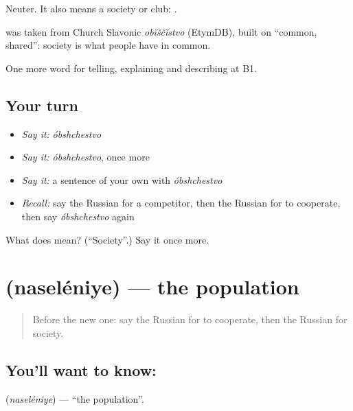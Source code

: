 Neuter. It also means a society or club: \emph{  }.

\begin{cousinweb}
\textbf{} was taken from Church Slavonic \emph{obĭščĭstvo} (EtymDB), built on \emph{} \textquotedblleft{}common, shared\textquotedblright{}: society is what people have in common.
\end{cousinweb}

\begin{grammarlens}[title={What you've built}]
One more word for telling, explaining and describing at B1.
\end{grammarlens}

\subsection*{Your turn}
\begin{itemize}
\raggedright
  \item \emph{Say it:} \emph{óbshchestvo}
  \item \emph{Say it:} \emph{óbshchestvo}, once more
  \item \emph{Say it:} a sentence of your own with \emph{óbshchestvo}
  \item \emph{Recall:} say the Russian for a competitor, then the Russian for to cooperate, then say \emph{óbshchestvo} again
\end{itemize}

\begin{tcolorbox}[breakable,colback=teal!4,colframe=teal!35!black,title={Before you move on}]
What does  mean? (\textquotedblleft{}Society\textquotedblright{}.) Say it once more.
\end{tcolorbox}
\section[\texorpdfstring{\ru{население} (naseléniye)}{население (naseléniye)}]{ (naseléniye) — the population}

\label{lesson:RU-C364-naselenie}



\begin{quote}
Before the new one: say the Russian for to cooperate, then the Russian for society.
\end{quote}

\subsection*{You'll want to know: }
\textbf{} (\emph{naseléniye}) — \textquotedblleft{}the population\textquotedblright{}.

